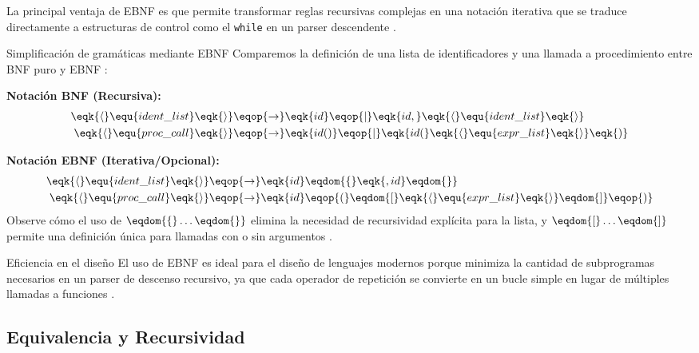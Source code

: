 La principal ventaja de EBNF es que permite transformar reglas recursivas complejas en una notación iterativa que se traduce directamente a estructuras de control como el \texttt{while} en un parser descendente \cite{aho2006compilers}.

\begin{ejemplo}{Simplificación de gramáticas mediante EBNF}
Comparemos la definición de una lista de identificadores y una llamada a procedimiento entre BNF puro y EBNF \cite{aho2006compilers}:

\textbf{Notación BNF (Recursiva):}
\begin{align*}
\eqk{\langle} \equ{ident\_list} \eqk{\rangle} &\eqop{\rightarrow} \eqk{id} \eqop{\mid} \eqk{id, } \eqk{\langle} \equ{ident\_list} \eqk{\rangle} \\
\eqk{\langle} \equ{proc\_call} \eqk{\rangle} &\eqop{\rightarrow} \eqk{id()} \eqop{\mid} \eqk{id(} \eqk{\langle} \equ{expr\_list} \eqk{\rangle} \eqk{)}
\end{align*}

\textbf{Notación EBNF (Iterativa/Opcional):}
\begin{align*}
\eqk{\langle} \equ{ident\_list} \eqk{\rangle} &\eqop{\rightarrow} \eqk{id} \eqdom{\{} \eqk{, id} \eqdom{\}} \\
\eqk{\langle} \equ{proc\_call} \eqk{\rangle} &\eqop{\rightarrow} \eqk{id} \eqop{(} \eqdom{[} \eqk{\langle} \equ{expr\_list} \eqk{\rangle} \eqdom{]} \eqop{)}
\end{align*}
Observe cómo el uso de $\eqdom{\{ } \dots \eqdom{\} }$ elimina la necesidad de recursividad explícita para la lista, y $\eqdom{[ } \dots \eqdom{ ]}$ permite una definición única para llamadas con o sin argumentos \cite{aho2006compilers}.
\end{ejemplo}

\begin{observacion}{Eficiencia en el diseño}
El uso de EBNF es ideal para el diseño de lenguajes modernos porque minimiza la cantidad de subprogramas necesarios en un parser de descenso recursivo, ya que cada operador de repetición se convierte en un bucle simple en lugar de múltiples llamadas a funciones \cite{aho2006compilers}.
\end{observacion}

\subsection{Equivalencia y Recursividad}
\label{subsec:3_3_3_equivalencia}

